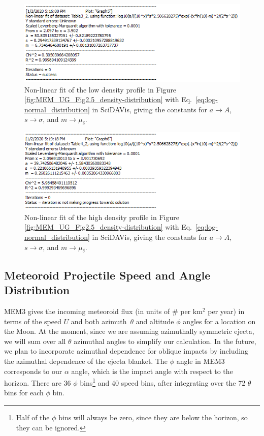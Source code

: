 \documentclass{hitec}
\numberwithin{equation}{section}
\begin{document}
\begin{figure}[h!]
	\centering
	\includegraphics[scale=0.85]{Fit-to-MEM_low_dens.PNG}
	\caption{Non-linear fit of the low density profile in Figure \ref{fig:MEM_UG_Fig2.5_density-distribution} with Eq.\ \ref{eq:log-normal_distribution} in \textsf{SciDAVis}, giving the constants for $a\rightarrow A$, $s\rightarrow \sigma$, and $m\rightarrow \mu_\delta$.}\label{fig:Fit-to-MEM_low_dens}
\end{figure}

\begin{figure}[h!]
	\centering
	\includegraphics[scale=0.85]{Fit-to-MEM_high_dens.PNG}
	\caption{Non-linear fit of the high density profile in Figure \ref{fig:MEM_UG_Fig2.5_density-distribution} with Eq.\ \ref{eq:log-normal_distribution} in \textsf{SciDAVis}, giving the constants for $a\rightarrow A$, $s\rightarrow \sigma$, and $m\rightarrow \mu_\delta$.}\label{fig:Fit-to-MEM_high_dens}
\end{figure}

\subsection{Meteoroid Projectile Speed and Angle Distribution}

MEM3 gives the incoming meteoroid flux (in units of \# per km$^2$ per year) in terms of the speed $U$ and both azimuth~$\theta$ and altitude $\phi$ angles for a location on the Moon. At the moment, since we are assuming azimuthally symmetric ejecta, we will sum over all $\theta$ azimuthal angles to simplify our calculation. In the future, we plan to incorporate azimuthal dependence for oblique impacts by including the azimuthal dependence of the ejecta blanket. The $\phi$ angle in MEM3 corresponds to our $\alpha$ angle, which is the impact angle with respect to the horizon. There are 36 $\phi$ bins\footnote{Half of the $\phi$ bins will always be zero, since they are below the horizon, so they can be ignored.} and 40 speed bins, after integrating over the 72 $\theta$ bins for each $\phi$ bin.
\end{document}
